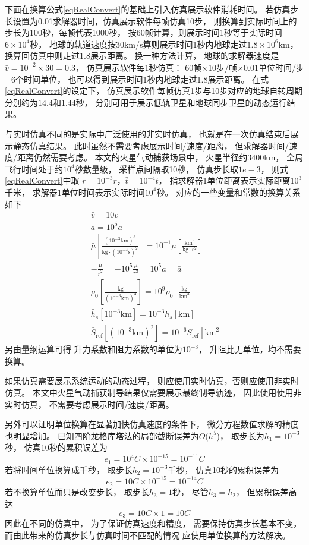 下面在换算公式\eqref{eqRealConvert}的基础上引入仿真展示软件消耗时间。
若仿真步长设置为0.01求解器时间，仿真展示软件每帧仿真10步，
则换算到实际时间上的步长为100秒，每帧代表1000秒，
按60帧计算，则展示时间1秒等于实际时间$6\times10^4$秒，
地球的轨道速度按30km/s算则展示时间1秒内地球走过$1.8\times10^6$km，
换算回仿真中则走过1.8展示距离。
换一种方法计算，
地球的求解器速度是$\bar{v}=10^{-2}\times30=0.3$，
仿真展示软件每1秒仿真：
60帧$\times$10步/帧$\times$0.01单位时间/步=6个时间单位，
也可以得到展示时间1秒内地球走过1.8展示距离。
在式\eqref{eqRealConvert}的设定下，
仿真展示软件每帧仿真1步与10步对应的地球自转周期分别约为$14.4$和$1.44$秒，
分别可用于展示低轨卫星和地球同步卫星的动态运行结果。

与实时仿真不同的是实际中广泛使用的非实时仿真，
也就是在一次仿真结束后展示静态仿真结果。
此时虽然不需要考虑展示时间/速度/距离，
但求解器时间/速度/距离仍然需要考虑。
本文的火星气动捕获场景中，
火星半径约$3400$km，
全局飞行时间处于约$10^4$秒数量级，
采样点间隔取10秒，
仿真步长取$1e-3$，
则式\eqref{eqRealConvert}中取
$\bar{r}=10^{-3}r$，$\bar{t}=10^{-4}t$，
指求解器1单位距离表示实际距离$10^3$千米，
求解器1单位时间表示实际时间$10^4$秒。
对应的一些变量和常数的换算关系如下
\begin{align*}
    &\bar{v} = 10v \\
    &\bar{a} = 10^5a \\
    &\bar{\mu}\left[\frac{(10^{-3}\text{km})^3}{\text{kg}\cdot(10^{-4}\text{s})^2}\right]
     = 10^{-1}\mu\left[\frac{\text{km}^3}{\text{kg}\cdot \text{s}^2}\right] \\
    &-\frac{\bar{\mu}}{\bar{r}^2} = -10^5\frac{\mu}{r^2} = 10^5a = \bar{a} \\
    &\bar{\rho_0}\left[\frac{\text{kg}}{(10^{-3}\text{km})^3}\right]
    = 10^9\rho_0\left[\frac{\text{kg}}{\text{km}^3}\right] \\
    &\bar{h}_s[10^{-3}\text{km}] = 10^{-3}h_s[\text{km}] \\
    &\bar{S}_\text{ref}[(10^{-3}\text{km})^2] = 10^{-6}S_\text{ref}[\text{km}^2]
\end{align*}
另由量纲运算可得
升力系数和阻力系数的单位为$10^{-3}$，
升阻比无单位，均不需要换算。

如果仿真需要展示系统运动的动态过程，
则应使用实时仿真，否则应使用非实时仿真。
本文中火星气动捕获制导结果仅需要展示最终制导轨迹，
因此使用使用非实时仿真，
不需要考虑展示时间/速度/距离。

另外可以证明单位换算在显著加快仿真速度的条件下，
微分方程数值求解的精度也明显增加。
已知四阶龙格库塔法的局部截断误差为$O(h^5$)\cite{mqingyang2019}，
取步长为$h_1=10^{-3}$秒，
仿真10秒的累积误差为
\[e_1=10^4C\times 10^{-15}=10^{-11}C\]
若将时间单位换算成千秒，
取步长$h_2=10^{-3}$千秒，
仿真10秒的累积误差为
\[e_2=10C\times 10^{-15}=10^{-14}C\]
若不换算单位而只是改变步长，
取步长$h_3=1$秒，
尽管$h_3=h_2$，
但累积误差高达
\[e_3=10C\times 1=10C\]
因此在不同的仿真中，
为了保证仿真速度和精度，
需要保持仿真步长基本不变，
而由此带来的仿真步长与仿真时间不匹配的情况
应使用单位换算的方法解决。
